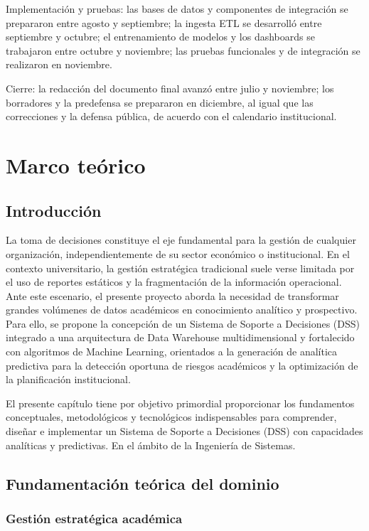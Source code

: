 \documentclass[11pt,oneside,openany]{book}
\begin{document}
Implementación y pruebas: las bases de datos y componentes de integración se prepararon entre agosto y septiembre; la ingesta ETL se desarrolló entre septiembre y octubre; el entrenamiento de modelos y los dashboards se trabajaron entre octubre y noviembre; las pruebas funcionales y de integración se realizaron en noviembre.

Cierre: la redacción del documento final avanzó entre julio y noviembre; los borradores y la predefensa se prepararon en diciembre, al igual que las correcciones y la defensa pública, de acuerdo con el calendario institucional.

\chapter{Marco teórico}

\section{Introducción}

La toma de decisiones constituye el eje fundamental para la gestión de cualquier organización, independientemente de su sector económico o institucional. En el contexto universitario, la gestión estratégica tradicional suele verse limitada por el uso de reportes estáticos y la fragmentación de la información operacional. Ante este escenario, el presente proyecto aborda la necesidad de transformar grandes volúmenes de datos académicos en conocimiento analítico y prospectivo. Para ello, se propone la concepción de un Sistema de Soporte a Decisiones (DSS) integrado a una arquitectura de Data Warehouse multidimensional y fortalecido con algoritmos de Machine Learning, orientados a la generación de analítica predictiva para la detección oportuna de riesgos académicos y la optimización de la planificación institucional.

El presente capítulo tiene por objetivo primordial proporcionar los fundamentos conceptuales, metodológicos y tecnológicos indispensables para comprender, diseñar e implementar un Sistema de Soporte a Decisiones (DSS) con capacidades analíticas y predictivas. En el ámbito de la Ingeniería de Sistemas.

\section{Fundamentación teórica del dominio}

\subsection{Gestión estratégica académica}
\end{document}

